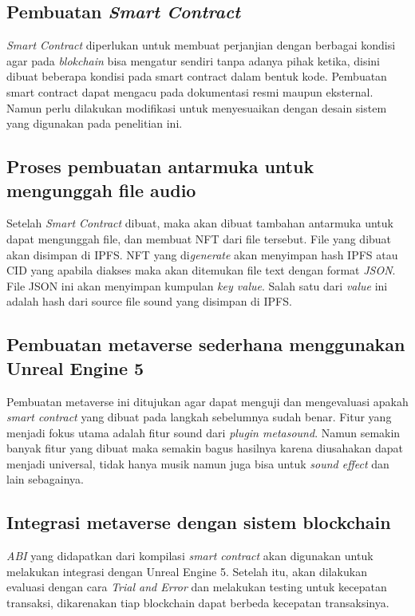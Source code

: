 \subsection{Pembuatan \emph{Smart Contract}}
\emph{Smart Contract} diperlukan untuk membuat perjanjian dengan
berbagai kondisi agar pada \emph{blokchain} bisa mengatur sendiri tanpa
adanya pihak ketika, disini dibuat beberapa kondisi pada
smart contract dalam bentuk kode. Pembuatan smart contract dapat mengacu pada dokumentasi resmi maupun eksternal.
Namun perlu dilakukan modifikasi untuk menyesuaikan dengan desain sistem yang digunakan pada penelitian
ini.

\subsection{Proses pembuatan antarmuka untuk mengunggah file audio}
Setelah \emph{Smart Contract} dibuat, maka akan dibuat tambahan antarmuka untuk dapat mengunggah file, dan membuat NFT dari file tersebut.
File yang dibuat akan disimpan di IPFS. NFT yang di\emph{generate} akan menyimpan hash IPFS atau CID yang apabila diakses maka akan ditemukan
file text dengan format \emph{JSON}. File JSON ini akan menyimpan kumpulan \emph{key value}. Salah satu dari \emph{value} ini adalah hash dari source file sound
yang disimpan di IPFS.

\subsection{Pembuatan metaverse sederhana menggunakan Unreal Engine 5}
Pembuatan metaverse ini ditujukan agar dapat menguji dan mengevaluasi apakah \emph{smart contract} yang dibuat pada langkah sebelumnya sudah benar.
Fitur yang menjadi fokus utama adalah fitur sound dari \emph{plugin metasound}. Namun semakin banyak fitur yang dibuat maka semakin bagus hasilnya karena
diusahakan dapat menjadi universal, tidak hanya musik namun juga bisa untuk \emph{sound effect} dan lain sebagainya.

\subsection{Integrasi metaverse dengan sistem blockchain}
\emph{ABI} yang didapatkan dari kompilasi \emph{smart contract} akan digunakan untuk melakukan integrasi dengan Unreal Engine 5.
Setelah itu, akan dilakukan evaluasi dengan cara \emph{Trial and Error} dan melakukan testing untuk kecepatan transaksi, dikarenakan
tiap blockchain dapat berbeda kecepatan transaksinya.

